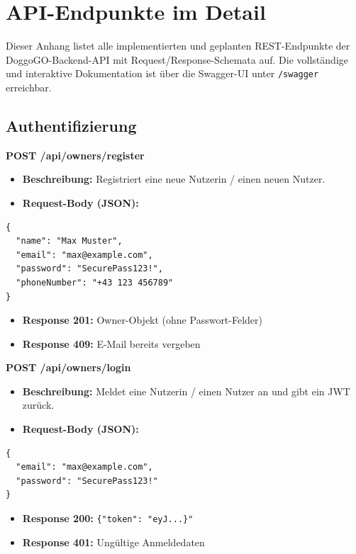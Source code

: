 \chapter{API-Endpunkte im Detail}
\label{app:api}

Dieser Anhang listet alle implementierten und geplanten REST-Endpunkte der
DoggoGO-Backend-API mit Request/Response-Schemata auf. Die vollständige und interaktive
Dokumentation ist über die Swagger-UI unter \texttt{/swagger} erreichbar.

\section*{Authentifizierung}

\textbf{POST /api/owners/register}

\begin{itemize}
  \item \textbf{Beschreibung:} Registriert eine neue Nutzerin / einen neuen Nutzer.
  \item \textbf{Request-Body (JSON):}
\end{itemize}
\begin{lstlisting}[language={}]
{
  "name": "Max Muster",
  "email": "max@example.com",
  "password": "SecurePass123!",
  "phoneNumber": "+43 123 456789"
}
\end{lstlisting}
\begin{itemize}
  \item \textbf{Response 201:} Owner-Objekt (ohne Passwort-Felder)
  \item \textbf{Response 409:} E-Mail bereits vergeben
\end{itemize}

\vspace{1em}
\textbf{POST /api/owners/login}
\begin{itemize}
  \item \textbf{Beschreibung:} Meldet eine Nutzerin / einen Nutzer an und gibt ein JWT zurück.
  \item \textbf{Request-Body (JSON):}
\end{itemize}
\begin{lstlisting}[language={}]
{
  "email": "max@example.com",
  "password": "SecurePass123!"
}
\end{lstlisting}
\begin{itemize}
  \item \textbf{Response 200:} \texttt{\{"token": "eyJ...\}"}
  \item \textbf{Response 401:} Ungültige Anmeldedaten
\end{itemize}

